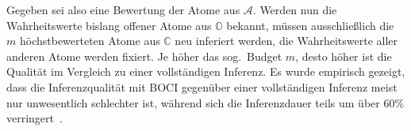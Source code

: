 Gegeben sei also eine Bewertung der Atome aus $\mathcal{A}$.
Werden nun die Wahrheitswerte bislang offener Atome aus $\mathbb{O}$ bekannt, müssen ausschließlich die $m$ höchstbewerteten Atome aus $\mathbb{C}$ neu inferiert werden, die Wahrheitswerte aller anderen Atome werden fixiert.
Je höher das sog.\ Budget $m$, desto höher ist die Qualität im Vergleich zu einer vollständigen Inferenz.
Es wurde empirisch gezeigt, dass die Inferenzqualität mit BOCI gegenüber einer vollständigen Inferenz meist nur unwesentlich schlechter ist, während sich die Inferenzdauer teils um über 60\% verringert~\cite[Kapitel 5]{Pujara2015}.
